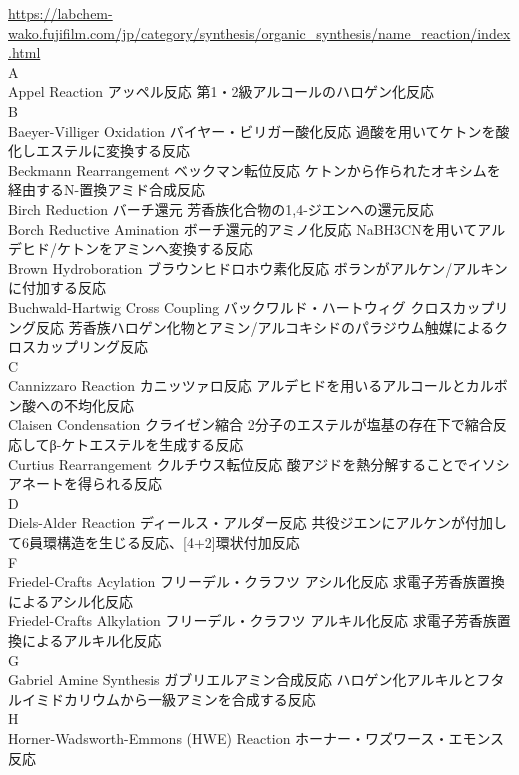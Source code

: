 \documentclass[dvipdfmx,uplatex]{jsarticle}
\begin{document}
\newpage

\url{https://labchem-wako.fujifilm.com/jp/category/synthesis/organic_synthesis/name_reaction/index.html} \\
\small
A \\
Appel Reaction	アッペル反応
	第1・2級アルコールのハロゲン化反応 \\
B \\
Baeyer-Villiger Oxidation	バイヤー・ビリガー酸化反応
	過酸を用いてケトンを酸化しエステルに変換する反応 \\
Beckmann Rearrangement	ベックマン転位反応
	ケトンから作られたオキシムを経由するN-置換アミド合成反応 \\
Birch Reduction	バーチ還元
	芳香族化合物の1,4-ジエンへの還元反応 \\
Borch Reductive Amination	ボーチ還元的アミノ化反応
	NaBH3CNを用いてアルデヒド/ケトンをアミンへ変換する反応 \\
Brown Hydroboration	ブラウンヒドロホウ素化反応
	ボランがアルケン/アルキンに付加する反応 \\
Buchwald-Hartwig Cross Coupling	バックワルド・ハートウィグ クロスカップリング反応
	芳香族ハロゲン化物とアミン/アルコキシドのパラジウム触媒によるクロスカップリング反応 \\
C \\
Cannizzaro Reaction	カニッツァロ反応
	アルデヒドを用いるアルコールとカルボン酸への不均化反応 \\
Claisen Condensation	クライゼン縮合
	2分子のエステルが塩基の存在下で縮合反応してβ-ケトエステルを生成する反応 \\
Curtius Rearrangement	クルチウス転位反応
	酸アジドを熱分解することでイソシアネートを得られる反応 \\
D \\
Diels-Alder Reaction	ディールス・アルダー反応
	共役ジエンにアルケンが付加して6員環構造を生じる反応、[4+2]環状付加反応 \\
F \\
Friedel-Crafts Acylation	フリーデル・クラフツ アシル化反応
	求電子芳香族置換によるアシル化反応 \\
Friedel-Crafts Alkylation	フリーデル・クラフツ アルキル化反応
	求電子芳香族置換によるアルキル化反応 \\
G \\
Gabriel Amine Synthesis	ガブリエルアミン合成反応
	ハロゲン化アルキルとフタルイミドカリウムから一級アミンを合成する反応 \\
H \\
Horner-Wadsworth-Emmons (HWE) Reaction	ホーナー・ワズワース・エモンス反応
\end{document}
